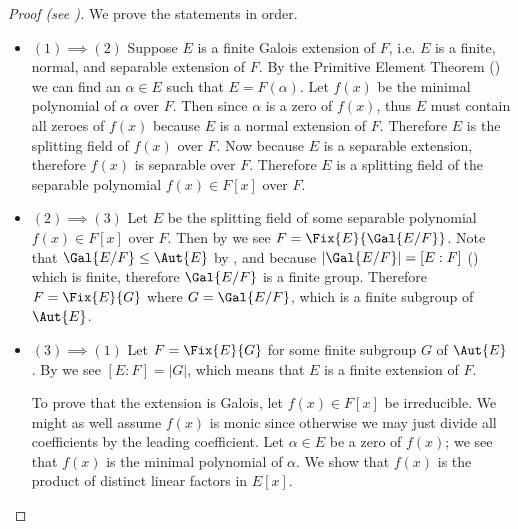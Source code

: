 \begin{proof}[Proof (see {\cite[Theorem 23.19]{judson_beezer_2022}})]
    We prove the statements in order.
    \begin{itemize}
        \item $\boxed{(1) \implies (2)}$ Suppose $E$ is a finite Galois extension of $F$, i.e. $E$ is a finite, normal, and separable extension of $F$. By the Primitive Element Theorem () we can find an $\alpha \in E$ such that $E = F(\alpha)$. Let $f(x)$ be the minimal polynomial of $\alpha$ over $F$. Then since $\alpha$ is a zero of $f(x)$, thus $E$ must contain all zeroes of $f(x)$ because $E$ is a normal extension of $F$. Therefore $E$ is the splitting field of $f(x)$ over $F$. Now because $E$ is a separable extension, therefore $f(x)$ is separable over $F$. Therefore $E$ is a splitting field of the separable polynomial $f(x) \in F[x]$ over $F$.

        \item $\boxed{(2) \implies (3)}$ Let $E$ be the splitting field of some separable polynomial $f(x) \in F[x]$ over $F$. Then by  we see $F = \Fix{E}{\Gal{E/F}}$. Note that $\Gal{E/F} \leq \Aut{E}$ by , and because $|\Gal{E/F}| = [E:F]$ () which is finite, therefore $\Gal{E/F}$ is a finite group. Therefore $F = \Fix{E}{G}$ where $G = \Gal{E/F}$, which is a finite subgroup of $\Aut{E}$.

        \item $\boxed{(3) \implies (1)}$ Let $F = \Fix{E}{G}$ for some finite subgroup $G$ of $\Aut{E}$. By  we see $[E:F] = |G|$, which means that $E$ is a finite extension of $F$.

        To prove that the extension is Galois, let $f(x) \in F[x]$ be irreducible. We might as well assume $f(x)$ is monic since otherwise we may just divide all coefficients by the leading coefficient. Let $\alpha \in E$ be a zero of $f(x)$; we see that $f(x)$ is the minimal polynomial of $\alpha$. We show that $f(x)$ is the product of distinct linear factors in $E[x]$.
        

\end{itemize}
\end{proof}
